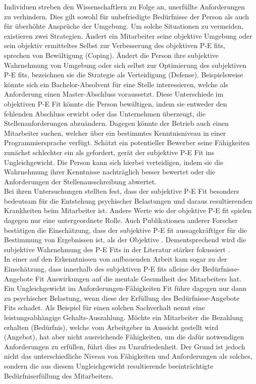 Individuen streben den Wissenschaftlern zu Folge an, unerfüllte Anforderungen zu verhindern. Dies gilt sowohl für unbefriedigte Bedürfnisse der Person als auch für überhöhte Ansprüche der Umgebung. Um solche Situationen zu vermeiden, existieren zwei Strategien. Ändert ein Mitarbeiter seine objektive Umgebung oder sein objektiv ermitteltes Selbst zur Verbesserung des objektiven P-E fits, sprechen \textcite{copingAndAdaption:1974} von Bewältigung (Coping). Ändert die Person ihre subjektive Wahrnehmung von Umgebung oder sich selbst zur Optimierung des subjektiven P-E fits, bezeichnen sie die Strategie als Verteidigung (Defense). Beispielsweise könnte sich ein Bachelor-Absolvent für eine Stelle interessieren, welche als Anforderung einen Master-Abschluss voraussetzt. Diese Unterschiede im objektiven P-E Fit könnte die Person bewältigen, indem sie entweder den fehlenden Abschluss erwirbt oder das Unternehmen überzeugt, die Stellenanforderungen abzuändern. Dagegen könnte der Betrieb auch einen Mitarbeiter suchen, welcher über ein bestimmtes Kenntnisniveau in einer Programmiersprache verfügt. Schätzt ein potentieller Bewerber seine Fähigkeiten zunächst schlechter ein als gefordert, gerät der subjektive P-E Fit ins Ungleichgewicht. Die Person kann sich hierbei verteidigen, indem sie die Wahrnehmung ihrer Kenntnisse nachträglich besser bewertet oder die Anforderungen der Stellenausschreibung abwertet.\\
Bei ihren Untersuchungen stellten \textcite{copingAndAdaption:1974} fest, dass der subjektive P-E Fit besonders bedeutsam für die Entstehung psychischer Belastungen und daraus resultierenden Krankheiten beim Mitarbeiter ist. Andere Werte wie der objektive P-E fit spielen dagegen nur eine untergeordnete Rolle. Auch Publikationen anderer Forscher bestätigen die Einschätzung, dass der subjektive P-E fit aussagekräftiger für die Bestimmung von Ergebnissen ist, als der Objektive \cite[S. 3]{carless:2005}. Dementsprechend wird die subjektive Wahrnehmung des P-E Fits in der Literatur stärker fokussiert \cite[S. 8]{caplan:1987}\cite[S. 9]{caplan:1993}\cite[S. 16]{choi:2004}.\\
In einer auf den Erkenntnissen von \textcite{copingAndAdaption:1974} aufbauenden Arbeit kam \textcite{harrison:1978} sogar zu der Einschätzung, dass innerhalb des subjektiven P-E fits alleine der Bedürfnisse-Angebote Fit Auswirkungen auf die mentale Gesundheit des Mitarbeiters hat. Ein Ungleichgewicht im Anforderungen-Fähigkeiten Fit führe dagegen nur dann zu psychischer Belastung, wenn diese der Erfüllung des Bedürfnisse-Angebote Fits schadet. Als Beispiel für einen solchen Sachverhalt nennt \textcite{harrison:1978} eine leistungsabhängige Gehalts-Auszahlung. Möchte ein Mitarbeiter die Bezahlung erhalten (Bedürfnis), welche vom Arbeitgeber in Aussicht gestellt wird (Angebot), hat aber nicht ausreichende Fähigkeiten, um die dafür notwendigen Anforderungen zu erfüllen, führt dies zu Unzufriedenheit. Der Grund ist jedoch nicht das unterschiedliche Niveau von Fähigkeiten und Anforderungen als solches, sondern die aus diesem Ungleichgewicht resultierende beeinträchtigte Bedürfniserfüllung des Mitarbeiters.\\
